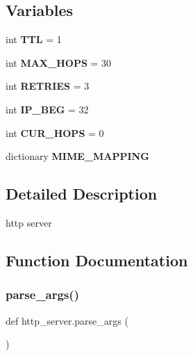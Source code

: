 \subsection*{Variables}
\begin{DoxyCompactItemize}
\item 
\mbox{\label{namespacehttp__server_acfc83951e70ad8027cff0c377774339b}} 
int {\bfseries T\+TL} = 1
\item 
\mbox{\label{namespacehttp__server_a0c9456e7f0d8bc402cd976905c042087}} 
int {\bfseries M\+A\+X\+\_\+\+H\+O\+PS} = 30
\item 
\mbox{\label{namespacehttp__server_a074d843d0c98741ac59e1955977cf2c1}} 
int {\bfseries R\+E\+T\+R\+I\+ES} = 3
\item 
\mbox{\label{namespacehttp__server_ac94f4b270720b0f21def82637adbaf9f}} 
int {\bfseries I\+P\+\_\+\+B\+EG} = 32
\item 
\mbox{\label{namespacehttp__server_aacbf2fcec8ac6dd3220f2a22a72c1a47}} 
int {\bfseries C\+U\+R\+\_\+\+H\+O\+PS} = 0
\item 
dictionary {\bfseries M\+I\+M\+E\+\_\+\+M\+A\+P\+P\+I\+NG}
\end{DoxyCompactItemize}


\subsection{Detailed Description}
\begin{DoxyVerb}http server \end{DoxyVerb}
 

\subsection{Function Documentation}
\mbox{\label{namespacehttp__server_a504a6ea54432b1a915324279e012f416}} 
\subsubsection{\texorpdfstring{parse\+\_\+args()}{parse\_args()}}
{\footnotesize\ttfamily def http\+\_\+server.\+parse\+\_\+args (\begin{DoxyParamCaption}{ }\end{DoxyParamCaption})}



